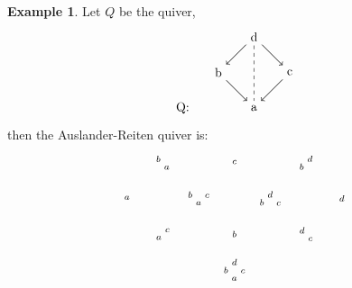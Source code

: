 \documentclass[11.5pt, twoside, a4paper, titlepage]{report}
\theoremstyle{definition}
\newtheorem{eg}[mydef]{Example}
\theoremstyle{plain}
\begin{document}
\begin{eg}
Let $Q$ be the quiver, 
\begin{equation*}
\begin{tikzpicture}[->,-latex, auto, m path/.style={->, semithick}, every node/.style={}]
\node 				(0) at (-2,0)		{Q:};
\node				(1) at (0,0)		{a};
\node 				(2) at (-1,1)		{b};
\node 				(3) at (1,1)		{c};
\node 				(4) at (0,2)		{d};

\draw (2) [m path] edge (1);
\draw (3) [m path] edge (1);
\draw (4) [m path] edge (2);
\draw (4) [m path] edge (3);
\draw (4) [-, dashed] edge (1);
\end{tikzpicture}
\end{equation*}
then the Auslander-Reiten quiver is:
\begin{equation*}
\begin{tikzpicture}[->,-latex, auto, main path/.style={->, semithick}, t path/.style={->, dashed, semithick}, every node/.style={}]
\node			(a) at (0,0)		{$\begin{smallmatrix}a\end{smallmatrix}$};
\node 			(ba) at (1,1)		{$\begin{smallmatrix}b& \\ &a\end{smallmatrix}$};
\node 			(ac) at (1,-1)		{$\begin{smallmatrix} & c \\ a&  \end{smallmatrix}$};
\node			(bca) at (2,0)	{$\begin{smallmatrix}b & & c\\  & a&\end{smallmatrix}$};
\node 			(c) at (3, 1)		{$\begin{smallmatrix}c\end{smallmatrix}$};
\node 			(b) at (3,-1)		{$\begin{smallmatrix}b\end{smallmatrix}$};
\node 			(dbca) at (3,-2)	{$\begin{smallmatrix}& d & \\ b& & c\\ & a &\end{smallmatrix}$};
\node 			(dbc) at (4,0)	{$\begin{smallmatrix}& d & \\ b& & c\end{smallmatrix}$};
\node 			(db) at (5,1)		{$\begin{smallmatrix} & d \\ b& \end{smallmatrix}$};
\node 			(dc) at (5,-1)		{$\begin{smallmatrix}d & \\ & c\end{smallmatrix}$};
\node 			(d) at (6,0)		{$\begin{smallmatrix}d\end{smallmatrix}$};


\end{tikzpicture}
\end{equation*}
\end{eg}
\end{document}
